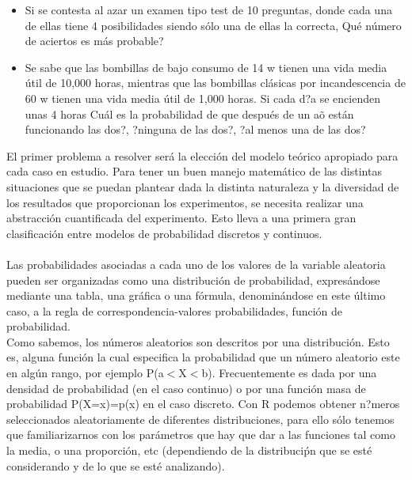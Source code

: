 \documentclass[12pt,letterpaper]{article}\usepackage[]{graphicx}\usepackage[]{color}
\begin{document}
\begin{itemize}
  \item Si se contesta al azar un examen tipo test de 10 preguntas, donde cada una de ellas tiene 4 posibilidades siendo s\'olo una de ellas la correcta, Qu\'e n\'umero de aciertos es m\'as probable? 
  \item Se sabe que las bombillas de bajo consumo de 14 w tienen una vida media \'util de 10,000 horas, mientras que las bombillas cl\'asicas por incandescencia de 60 w tienen una vida media \'util de 1,000 horas. Si cada d?a se encienden unas 4 horas Cu\'al es la probabilidad de que despu\'es de un a\~o est\'an funcionando las dos?, ?ninguna de las dos?, ?al menos una de las dos? 
\end{itemize}

El primer problema a resolver ser\'a la elecci\'on del modelo te\'orico apropiado para cada caso en estudio. Para tener un buen manejo matem\'atico de las distintas situaciones que se puedan plantear dada la distinta naturaleza y la diversidad de los resultados que proporcionan los experimentos, se necesita realizar una abstracci\'on cuantificada del experimento. Esto lleva a una primera gran clasificaci\'on entre modelos de probabilidad discretos y continuos.\\

\\ Las probabilidades asociadas a cada uno de los valores de la variable aleatoria pueden ser organizadas como una distribuci\'on de probabilidad, expres\'andose mediante una tabla, una gr\'afica o una f\'ormula, denomin\'andose en este \'ultimo caso, a la regla de correspondencia-valores probabilidades, funci\'on de probabilidad.\\

Como sabemos, los n\'umeros aleatorios son descritos por una distribuci\'on. Esto es, alguna funci\'on la cual especifica la probabilidad que un n\'umero aleatorio este en alg\'un rango, por ejemplo P(a$<$X$<$b). Frecuentemente es dada por una densidad de probabilidad (en el caso continuo) o por una funci\'on masa de probabilidad P(X=x)=p(x) en el caso discreto. Con R podemos obtener n?meros seleccionados aleatoriamente de diferentes distribuciones, para ello s\'olo tenemos que familiarizarnos con los par\'ametros que hay que dar a las funciones tal como la media, o una proporci\'on, etc (dependiendo de la distribuci\'pn que se est\'e considerando y de lo que se est\'e analizando).\\

\newpage
\end{document}
